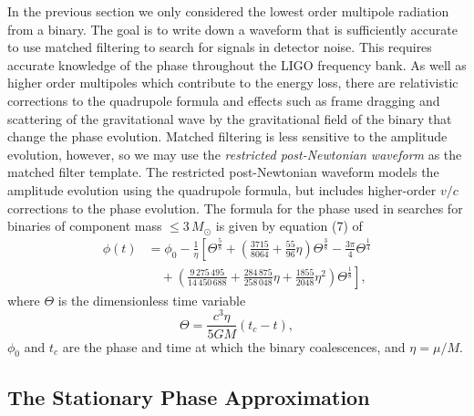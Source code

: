 In the previous section we only considered the lowest order multipole
radiation from a binary. The goal is to write down a waveform that is
sufficiently accurate to use matched filtering to search for signals in
detector noise. This requires accurate knowledge of the phase throughout the
LIGO frequency bank. As well as higher order multipoles which contribute to the
energy loss, there are relativistic corrections to the quadrupole formula and
effects such as frame dragging and scattering of the gravitational wave by the
gravitational field of the binary that change the phase evolution. Matched
filtering is less sensitive to the amplitude evolution, however, so we may use
the \emph{restricted post-Newtonian waveform} as the matched filter template.
The restricted post-Newtonian waveform models the amplitude evolution using
the quadrupole formula, but includes higher-order $v/c$ corrections to the phase
evolution. The formula for the phase used in searches for binaries of
component mass $\le 3\,M_\odot$ is given by equation (7) of
\cite{Blanchet:1996pi}
\begin{equation}
\begin{split}
\phi(t) &= \phi_0 - \frac{1}{\eta} \left[ 
\Theta^\frac{5}{8} + \left(\frac{3715}{8064} + \frac{55}{96}\eta\right)
\Theta^\frac{3}{8} - \frac{3\pi}{4} \Theta^\frac{1}{4} \right. \\
&\quad 
+\left. \left(\frac{9\,275\,495}{14\,450\,688} + \frac{284\,875}{258\,048}\eta +
\frac{1855}{2048} \eta^2\right) \Theta^\frac{1}{8} \right],
\label{eq:biwwphase}
\end{split}
\end{equation}
where $\Theta$ is the dimensionless time variable
\begin{equation}
\Theta = \frac{c^3\eta}{5GM}(t_c - t),
\end{equation}
$\phi_0$ and $t_c$ are the phase and time at which the binary coalescences, and
$\eta = \mu / M$.

\subsection{The Stationary Phase Approximation}
\label{ss:stationaryphase}

